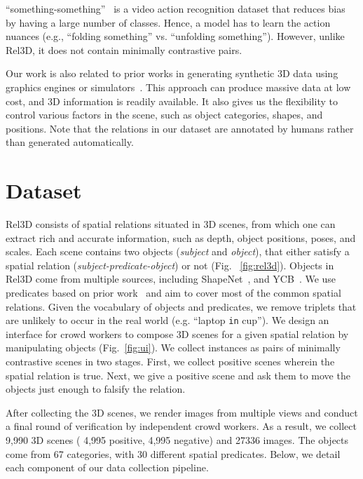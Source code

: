 \documentclass{article}
\newcommand{\smallsec}[1]{\noindent {\bf #1.}}
\newcommand\datasetname{Rel3D}
\newcommand\numscenes{9,990}
\newcommand\numpositives{4,995}
\newcommand\numnegatives{4,995}
\newcommand\numobjectcategories{67}
\newcommand\numpredicates{30}
\newcommand\numimages{27336}
\begin{document}
``something-something''~\cite{goyal2017something} is a video action recognition dataset that reduces bias by having a large number of classes. Hence, a model has to learn the action nuances (e.g., ``folding something'' vs. ``unfolding something''). However, unlike \datasetname, it does not contain minimally contrastive pairs.

\smallsec{Generating synthetic 3D data} Our work is also related to prior works in generating synthetic 3D data using graphics engines or simulators~\cite{richter2016playing,shafaei2016play,kolve2017ai2,johnson2017clevr,mccormac2017scenenet,dosovitskiy2017carla,goyal2020packit}. This approach can produce massive data at low cost, and 3D information is readily available. It also gives us the flexibility to control various factors in the scene, such as object categories, shapes, and positions. Note that the relations in our dataset are annotated by humans rather than generated automatically.

\vspace{-1em}
\section{Dataset}
\vspace{-1em}

{\datasetname } consists of spatial relations situated in 3D scenes, from which one can extract rich and accurate information, such as depth, object positions, poses, and scales. Each scene contains two objects (\emph{subject} and \emph{object}), that either satisfy a spatial relation (\emph{subject-predicate-object}) or not (Fig. ~\ref{fig:rel3d}).
Objects in {\datasetname } come from multiple sources, including ShapeNet~\cite{shapenet2015}, and YCB~\cite{calli2015ycb}. We use predicates based on prior work~\cite{landau1993and} and aim to cover most of the common spatial relations. Given the vocabulary of objects and predicates, we remove triplets that are unlikely to occur in the real world (e.g. ``laptop \texttt{in} cup''). We design an interface for crowd workers to compose 3D scenes for a given spatial relation by manipulating objects (Fig.~\ref{fig:ui}). We collect instances as pairs of minimally contrastive scenes in two stages. First, we collect positive scenes wherein the spatial relation is true. Next, we give a positive scene and ask them to move the objects just enough to falsify the relation.

After collecting the 3D scenes, we render images from multiple views and conduct a final round of verification by independent crowd workers. As a result, we collect {\numscenes } 3D scenes ( {\numpositives } positive, {\numnegatives } negative) and {\numimages} images. The objects come from {\numobjectcategories } categories, with {\numpredicates } different spatial predicates. Below, we detail each component of our data collection pipeline.
\end{document}
